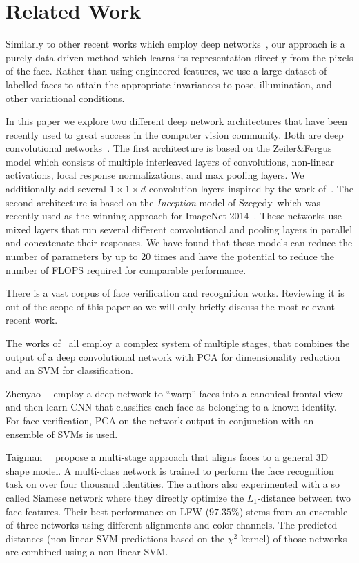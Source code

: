 \documentclass[10pt,twocolumn,letterpaper]{article}
\begin{document}
\section{Related Work} \label{RelatedWork}

Similarly to other recent works which employ deep
networks~\cite{deepid2plus,deepface}, our approach is a purely data driven
method which learns its representation directly from the pixels of the face.
Rather than using engineered features, we use a large dataset of labelled faces
to attain the appropriate invariances to pose, illumination, and other
variational conditions.

In this paper we explore two different deep network architectures that have
been recently used to great success in the computer vision community.  Both are
deep convolutional networks~\cite{lecun1989backprop,backprop1986}. The first
architecture is based on the Zeiler\&Fergus~\cite{zeilerfergus} model which
consists of multiple interleaved layers of convolutions, non-linear
activations, local response normalizations, and max pooling layers. We
additionally add several $1{\times}1{\times}d$ convolution layers inspired by
the work of~\cite{networkinnetwork}.  The second architecture is based on the
\textit{Inception} model of Szegedy~\etal which was recently used as the
winning approach for ImageNet 2014~\cite{SzegedyILSVRC2014}. These networks use
mixed layers that run several different convolutional and pooling layers in
parallel and concatenate their responses. We have found that these models can
reduce the number of parameters by up to 20 times and have the potential to
reduce the number of FLOPS required for comparable performance.

There is a vast corpus of face verification and recognition works. Reviewing it
is out of the scope of this paper so we will only briefly discuss the most
relevant recent work.

The works of~\cite{deepid2plus,deepface,zhenyao2014} all employ a complex
system of multiple stages, that combines the output of a deep convolutional
network with PCA for dimensionality reduction and an SVM for classification.

Zhenyao~\etal~\cite{zhenyao2014} employ a deep network to ``warp'' faces
into a canonical frontal view and then learn CNN that classifies each face as
belonging to a known identity. For face verification, PCA on the network output
in conjunction with an ensemble of SVMs is used.

Taigman~\etal~\cite{deepface} propose a multi-stage approach that aligns faces
to a general 3D shape model. A multi-class network is trained to perform the
face recognition task on over four thousand identities. The authors also
experimented with a so called Siamese network where they directly optimize the
$L_1$-distance between two face features. Their best performance on LFW
($97.35\%$) stems from an ensemble of three networks using different alignments
and color channels. The predicted distances (non-linear SVM predictions based
on the $\chi^2$ kernel) of those networks are combined using a non-linear SVM.
\end{document}
